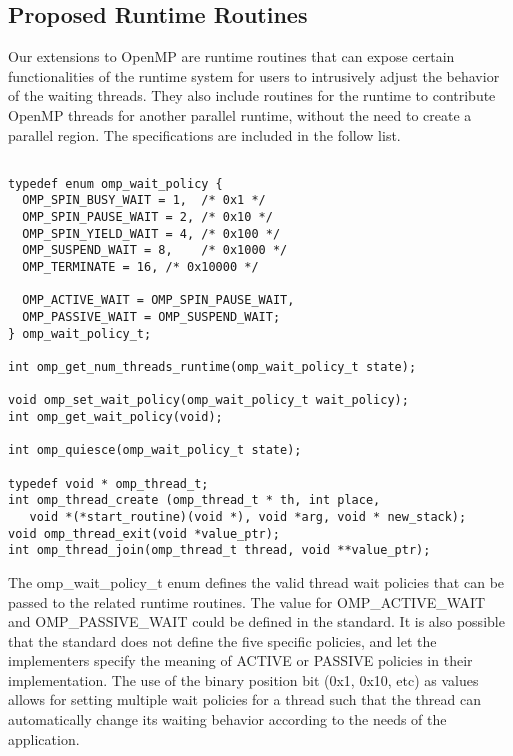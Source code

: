 \subsection{Proposed Runtime Routines} 
Our extensions to OpenMP are runtime routines that can expose 
certain functionalities of the runtime system for users to 
intrusively adjust the behavior of the waiting threads.  
They also include routines for the runtime to contribute OpenMP threads for another parallel runtime, without
the need to create a {\sf parallel} region. The specifications are included in the follow list. 

\lstset{basicstyle=\sffamily\footnotesize,language=c, numbersep=1pt}
\begin{lstlisting}[frame=single]  % Start your code-block

typedef enum omp_wait_policy {
  OMP_SPIN_BUSY_WAIT = 1,  /* 0x1 */
  OMP_SPIN_PAUSE_WAIT = 2, /* 0x10 */
  OMP_SPIN_YIELD_WAIT = 4, /* 0x100 */
  OMP_SUSPEND_WAIT = 8,    /* 0x1000 */
  OMP_TERMINATE = 16, /* 0x10000 */

  OMP_ACTIVE_WAIT = OMP_SPIN_PAUSE_WAIT,
  OMP_PASSIVE_WAIT = OMP_SUSPEND_WAIT;
} omp_wait_policy_t; 

int omp_get_num_threads_runtime(omp_wait_policy_t state);

void omp_set_wait_policy(omp_wait_policy_t wait_policy);
int omp_get_wait_policy(void);

int omp_quiesce(omp_wait_policy_t state);

typedef void * omp_thread_t;
int omp_thread_create (omp_thread_t * th, int place,  
   void *(*start_routine)(void *), void *arg, void * new_stack);
void omp_thread_exit(void *value_ptr);
int omp_thread_join(omp_thread_t thread, void **value_ptr);

\end{lstlisting}
The {\sf omp\_wait\_policy\_t} enum defines the valid thread wait policies that can be passed to the 
related runtime routines. The value for {\sf OMP\_ACTIVE\_WAIT} and {\sf OMP\_PASSIVE\_WAIT} could be defined
in the standard. It is also possible that the standard does not define the five specific policies, and let 
the implementers specify the meaning of {\sf ACTIVE} or {\sf PASSIVE} policies in their implementation. The use of the binary
position bit (0x1, 0x10, etc) as values allows for setting multiple wait policies for a thread such that the thread can automatically change
its waiting behavior according to the needs of the application. 


